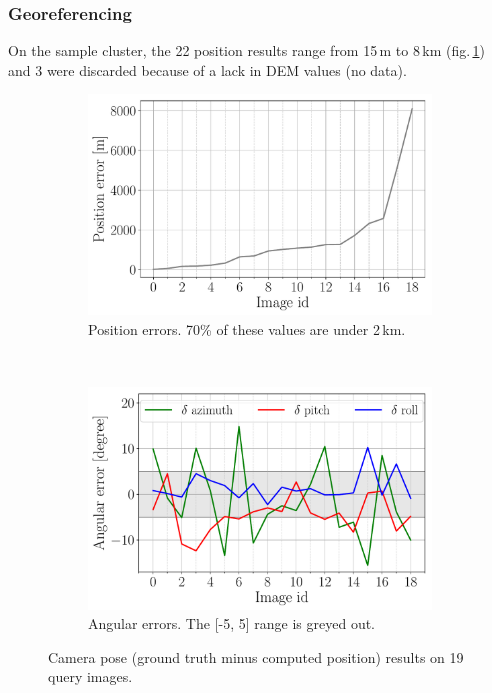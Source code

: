 \documentclass[fleqn,10pt]{wlpeerj} %
\begin{document}
\subsubsection*{Georeferencing}
On the sample cluster, the 22 position results range from 15\,m to 8\,km (fig.\,\ref{pose:1}) and 3
were discarded because of a lack in DEM values (no data).



\begin{figure}[H]
\centering
\begin{subfigure}{0.48\linewidth}
    \includegraphics[width=1\linewidth]{pos.pdf}
    \caption{Position errors. 70\% of these values are under 2\,km.}
    \label{pose:1}
\end{subfigure}
~
\begin{subfigure}{0.48\linewidth}
    \includegraphics[width=1\linewidth]{angles.pdf}
    \caption{Angular errors. The [-5, 5] range is greyed out.}
    \label{pose:2}
\end{subfigure}
\caption{Camera pose (ground truth minus computed position) results on 19 query images.}
\label{pose}
\end{figure}
\end{document}

